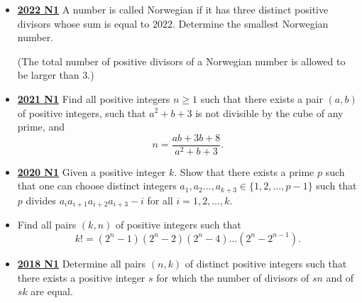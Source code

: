 \documentclass[11pt]{scrartcl}
\begin{document}
\begin{itemize}[leftmargin=*]
    \item \href{https://artofproblemsolving.com/community/c6h3107332p28104270}{\textbf{2022 N1}} A number is called Norwegian if it has three distinct positive divisors whose sum is equal to $2022$. Determine the smallest Norwegian number. 
    
    (The total number of positive divisors of a Norwegian number is allowed to be larger than $3$.) 
    
    \item \href{https://artofproblemsolving.com/community/c6h2882583p25627819}{\textbf{2021 N1}} 	Find all positive integers $n\geqslant  1$ such that there exists a pair $(a,b)$ of positive integers, such that $a^2+b+3$ is not divisible by the cube of any prime, and$$n=\frac{ab+3b+8}{a^2+b+3}.$$
    
    \item \href{https://artofproblemsolving.com/community/c6h2625898p22698342}{\textbf{2020 N1}} Given a positive integer $k$. Show that there exists a prime $p$ such that one can choose distinct integers $a_1,a_2\dots, a_{k+3} \in \{1, 2, \dots ,p-1\}$ such that $p$ divides $a_ia_{i+1}a_{i+2}a_{i+3}-i$ for all $i= 1, 2, \dots, k$.
    
    \item {} Find all pairs $(k,n)$ of positive integers such that\[ k!=(2^n-1)(2^n-2)(2^n-4)\dots(2^n-2^{n-1}). \]
    
    \item \href{https://artofproblemsolving.com/community/c6h1876768p12752840}{\textbf{2018 N1}}  Determine all pairs $(n, k)$ of distinct positive integers such that there exists a positive integer $s$ for which the number of divisors of $sn$ and of $sk$ are equal.
    \newpage
    

\end{itemize}
\end{document}

